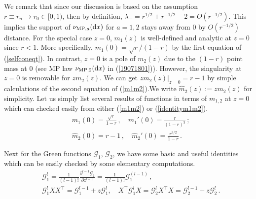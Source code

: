 \documentclass[12pt]{article}
\numberwithin{equation}{section}
\theoremstyle{remark}
\newcommand{\1}{{\rm 1}\kern-0.24em{\rm I}}
\begin{document}
\begin{appendices}
We remark that since our discussion is based on the assumption $r\equiv r_n\to r_0 \in [0,1)$, then by definition,  $\lambda_- =r^{1/2}+r^{-1/2} -2 = O(r^{-1/2})$. This implies the  support of $\nu_{\text{MP},a}({\rm d}x)$ for $a=1,2$   stays away from $0$ by  $O(r^{-1/2})$  distance. For the special case $z=0$, $m_1(z)$ is well-defined and analytic at $z=0$ since $r<1$. More specifically,  $m_1(0)= \sqrt r/(1-r)$ by the first equation of (\ref{selfconeqt}). In contrast, $z=0$  is a pole of  $m_2(z)$ due to the $(1-r)$ point mass at $0$ (see MP law $\nu_{\text{MP},2}({\rm d}x)$ in (\ref{19071801})). However, the singularity at $z=0$ is removable for $zm_2(z)$. We can get  $zm_2(z)|_{z=0} = r-1$ by simple calculations of the second equation of (\ref{m1m2}).We write $\widehat m_2(z):= zm_2(z)$ for simplicity. Let us simply list several results of functions in terms of $m_{1,2}$ at $z=0$ which can checked easily from either (\ref{m1m2}) or (\ref{identitym1m2}).
\begin{align}
&m_1(0)= \frac{\sqrt r}{1-r}\,,\quad m_1'(0)= \frac{r}{(1-r)^3}\,; \label{values:m_1s} \\
&\widehat m_2(0)= r-1\,, \quad \widehat m_2'(0) = \frac{r^{3/2}}{1-r} \label{values:zm_2s}\,.
\end{align}

Next for the Green functions $\mathcal{G}_1$, $\mathcal{G}_2$, we have some basic and useful identities which can be easily checked by some elementary computations. 
\begin{align}
&\mathcal{G}_1^{l}=\frac{1}{(l-1)!}\frac{\partial^{l-1}\mathcal{G}_1}{\partial z^{l-1}} = \frac{1}{(l-1)!} \mathcal{G}_1^{(l-1)}\,,\label{eq:basicG}\\   
&\mathcal{G}_1^l{X}{X}^{\top}=\mathcal{G}_1^{l-1}+z\mathcal{G}_1^{l}, \quad {X}^{\top}\mathcal{G}_1^l{X}=\mathcal{G}_2^l{X}^{\top} {X}=\mathcal{G}_2^{l-1}+z\mathcal{G}_2^{l}\,. \label{relationXG}
\end{align}


\end{appendices}
\end{document}
